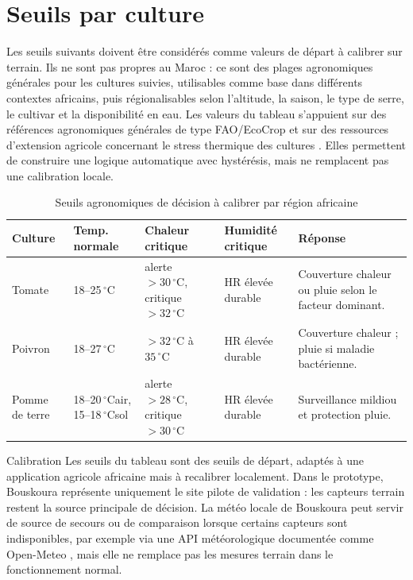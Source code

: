 ﻿\documentclass[11pt,a4paper,openany]{report}
\newcommand{\degC}{\ensuremath{\,^\circ\mathrm{C}}}
\begin{document}
\section{Seuils par culture}
Les seuils suivants doivent être considérés comme valeurs de départ à calibrer sur terrain. Ils ne sont pas propres au Maroc : ce sont des plages agronomiques générales pour les cultures suivies, utilisables comme base dans différents contextes africains, puis régionalisables selon l'altitude, la saison, le type de serre, le cultivar et la disponibilité en eau. Les valeurs du tableau s'appuient sur des références agronomiques générales de type FAO/EcoCrop et sur des ressources d'extension agricole concernant le stress thermique des cultures \cite{faotomato,faopepper,faopotato,pennstateheat,umnpepper}. Elles permettent de construire une logique automatique avec hystérésis, mais ne remplacent pas une calibration locale.

\begin{table}[H]
\centering
\small
\renewcommand{\arraystretch}{1.3}

\begin{tabular}{|p{2.4cm}|p{2.4cm}|p{2.4cm}|p{2.8cm}|p{4cm}|}
\hline
\textbf{Culture} &
\textbf{Temp. normale} &
\textbf{Chaleur critique} &
\textbf{Humidité critique} &
\textbf{Réponse} \\
\hline

Tomate &
18--25\degC &
alerte \(>30\degC\), critique \(>32\degC\) &
HR élevée durable &
Couverture chaleur ou pluie selon le facteur dominant. \\
\hline

Poivron &
18--27\degC &
\(>32\degC\) à \(35\degC\) &
HR élevée durable &
Couverture chaleur ; pluie si maladie bactérienne. \\
\hline

Pomme de terre &
18--20\degC air, 15--18\degC sol &
alerte \(>28\degC\), critique \(>30\degC\) &
HR élevée durable &
Surveillance mildiou et protection pluie. \\
\hline

\end{tabular}

\caption{Seuils agronomiques de décision à calibrer par région africaine}
\label{tab:seuils_culture}
\end{table}

\begin{importantbox}{Calibration}
Les seuils du tableau sont des seuils de départ, adaptés à une application agricole africaine mais à recalibrer localement. Dans le prototype, Bouskoura représente uniquement le site pilote de validation : les capteurs terrain restent la source principale de décision. La météo locale de Bouskoura peut servir de source de secours ou de comparaison lorsque certains capteurs sont indisponibles, par exemple via une API météorologique documentée comme Open-Meteo \cite{openmeteo,openmeteolicence}, mais elle ne remplace pas les mesures terrain dans le fonctionnement normal.
\end{importantbox}
\end{document}
